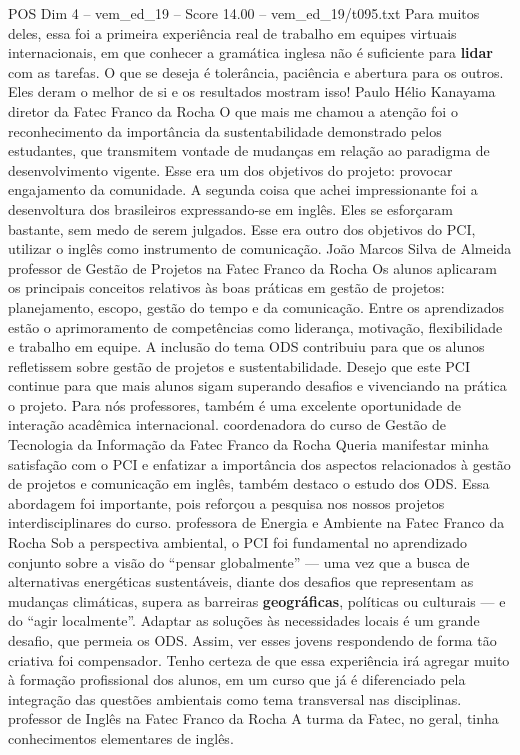 \begin{textsample}{POS Dim 4 – vem\_ed\_19 – Score 14.00 – vem\_ed\_19/t095.txt}
Para muitos deles, essa foi a primeira experiência real de trabalho em equipes virtuais internacionais, em que conhecer a gramática inglesa não é suficiente para \textbf{lidar} com as tarefas.
O que se deseja é tolerância, paciência e abertura para os outros.
Eles deram o melhor de si e os resultados mostram isso!
Paulo Hélio Kanayama diretor da Fatec Franco da Rocha O que mais me chamou a atenção foi o reconhecimento da importância da sustentabilidade demonstrado pelos estudantes, que transmitem vontade de mudanças em relação ao paradigma de desenvolvimento vigente.
Esse era um dos objetivos do projeto: provocar engajamento da comunidade.
A segunda coisa que achei impressionante foi a desenvoltura dos brasileiros expressando-se em inglês.
Eles se esforçaram bastante, sem medo de serem julgados.
Esse era outro dos objetivos do PCI, utilizar o inglês como instrumento de comunicação.
João Marcos Silva de Almeida professor de Gestão de Projetos na Fatec Franco da Rocha Os alunos aplicaram os principais conceitos relativos às boas práticas em gestão de projetos: planejamento, escopo, gestão do tempo e da comunicação.
Entre os aprendizados estão o aprimoramento de competências como liderança, motivação, flexibilidade e trabalho em equipe.
A inclusão do tema ODS contribuiu para que os alunos refletissem sobre gestão de projetos e sustentabilidade.
Desejo que este PCI continue para que mais alunos sigam superando desafios e vivenciando na prática o projeto.
Para nós professores, também é uma excelente oportunidade de interação acadêmica internacional. coordenadora do curso de Gestão de Tecnologia da Informação da Fatec Franco da Rocha Queria manifestar minha satisfação com o PCI e enfatizar a importância dos aspectos relacionados à gestão de projetos e comunicação em inglês, também destaco o estudo dos ODS.
Essa abordagem foi importante, pois reforçou a pesquisa nos nossos projetos interdisciplinares do curso. professora de Energia e Ambiente na Fatec Franco da Rocha Sob a perspectiva ambiental, o PCI foi fundamental no aprendizado conjunto sobre a visão do “pensar globalmente” — uma vez que a busca de alternativas energéticas sustentáveis, diante dos desafios que representam as mudanças climáticas, supera as barreiras \textbf{geográficas}, políticas ou culturais — e do “agir localmente”.
Adaptar as soluções às necessidades locais é um grande desafio, que permeia os ODS.
Assim, ver esses jovens respondendo de forma tão criativa foi compensador.
Tenho certeza de que essa experiência irá agregar muito à formação profissional dos alunos, em um curso que já é diferenciado pela integração das questões ambientais como tema transversal nas disciplinas. professor de Inglês na Fatec Franco da Rocha A turma da Fatec, no geral, tinha conhecimentos elementares de inglês.

\end{textsample}
